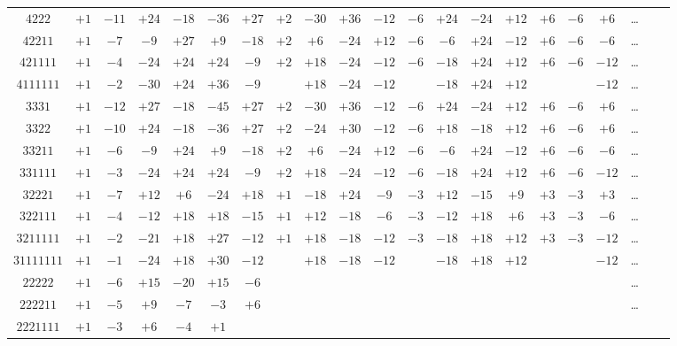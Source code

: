\documentclass[12pt,a4paper]{article}
\theoremstyle{definition}
\begin{document}
\begin{center}
\begin{tabular}{c|c|c|c|c|c|c|c|c|c|c|c|c|c|c|c|c|c|c|c|c}
$4222$ & $+1$ & $-11$ & $+24$ & $-18$ & $-36$ & $+27$ & $+2$ & $-30$ & $+36$ & $-12$ & $-6$ & $+24$ & $-24$ & $+12$ & $+6$ & $-6$ & $+6$ & \dots \\
$42211$ & $+1$ & $-7$ & $-9$ & $+27$ & $+9$ & $-18$ & $+2$ & $+6$ & $-24$ & $+12$ & $-6$ & $-6$ & $+24$ & $-12$ & $+6$ & $-6$ & $-6$ & \dots \\
$421111$ & $+1$ & $-4$ & $-24$ & $+24$ & $+24$ & $-9$ & $+2$ & $+18$ & $-24$ & $-12$ & $-6$ & $-18$ & $+24$ & $+12$ & $+6$ & $-6$ & $-12$ & \dots \\
$4111111$ & $+1$ & $-2$ & $-30$ & $+24$ & $+36$ & $-9$ & & $+18$ & $-24$ & $-12$ & & $-18$ & $+24$ & $+12$ & & & $-12$ & \dots \\
$3331$ & $+1$ & $-12$ & $+27$ & $-18$ & $-45$ & $+27$ & $+2$ & $-30$ & $+36$ & $-12$ & $-6$ & $+24$ & $-24$ & $+12$ & $+6$ & $-6$ & $+6$ & \dots \\
$3322$ & $+1$ & $-10$ & $+24$ & $-18$ & $-36$ & $+27$ & $+2$ & $-24$ & $+30$ & $-12$ & $-6$ & $+18$ & $-18$ & $+12$ & $+6$ & $-6$ & $+6$ & \dots \\
$33211$ & $+1$ & $-6$ & $-9$ & $+24$ & $+9$ & $-18$ & $+2$ & $+6$ & $-24$ & $+12$ & $-6$ & $-6$ & $+24$ & $-12$ & $+6$ & $-6$ & $-6$ & \dots \\
$331111$ & $+1$ & $-3$ & $-24$ & $+24$ & $+24$ & $-9$ & $+2$ & $+18$ & $-24$ & $-12$ & $-6$ & $-18$ & $+24$ & $+12$ & $+6$ & $-6$ & $-12$ & \dots \\
$32221$ & $+1$ & $-7$ & $+12$ & $+6$ & $-24$ & $+18$ & $+1$ & $-18$ & $+24$ & $-9$ & $-3$ & $+12$ & $-15$ & $+9$ & $+3$ & $-3$ & $+3$ & \dots \\
$322111$ & $+1$ & $-4$ & $-12$ & $+18$ & $+18$ & $-15$ & $+1$ & $+12$ & $-18$ & $-6$ & $-3$ & $-12$ & $+18$ & $+6$ & $+3$ & $-3$ & $-6$ & \dots \\
$3211111$ & $+1$ & $-2$ & $-21$ & $+18$ & $+27$ & $-12$ & $+1$ & $+18$ & $-18$ & $-12$ & $-3$ & $-18$ & $+18$ & $+12$ & $+3$ & $-3$ & $-12$ & \dots \\
$31111111$ & $+1$ & $-1$ & $-24$ & $+18$ & $+30$ & $-12$ & & $+18$ & $-18$ & $-12$ & & $-18$ & $+18$ & $+12$ & & & $-12$ & \dots \\
$22222$ & $+1$ & $-6$ & $+15$ & $-20$ & $+15$ & $-6$ & & & & & & & & & & & & \dots \\
$222211$ & $+1$ & $-5$ & $+9$ & $-7$ & $-3$ & $+6$ & & & & & & & & & & & & \dots \\
$2221111$ & $+1$ & $-3$ & $+6$ & $-4$ & $+1$ & & & & & & & & & & & & &
\end{tabular}
\end{center}
\end{document}
